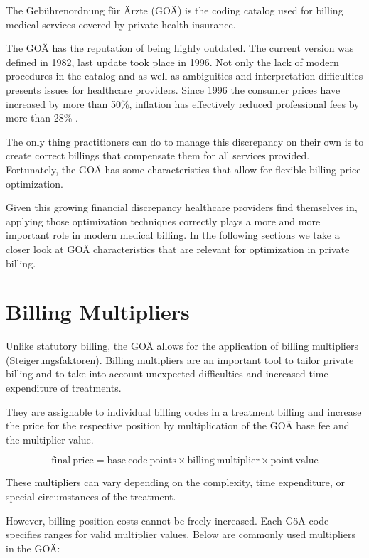 The Gebührenordnung für Ärzte (GOÄ) is the coding catalog used for billing medical services covered by private health insurance.

The GOÄ has the reputation of being highly outdated\cite{heller2015goa}.
The current version was defined in 1982, last update took place in 1996.
Not only the lack of modern procedures in the catalog and as well as ambiguities and interpretation difficulties presents issues for healthcare providers.
Since 1996 the consumer prices have increased by more than 50\%, inflation has effectively reduced professional fees by more than 28\% \cite{schmitzgoa}.

The only thing practitioners can do to manage this discrepancy on their own is to create correct billings that compensate them for all services provided.
Fortunately, the GOÄ has some characteristics that allow for flexible billing price optimization.

Given this growing financial discrepancy healthcare providers find themselves in, applying those optimization techniques correctly plays a more and more important role in modern medical billing.
In the following sections we take a closer look at GOÄ characteristics that are relevant for optimization in private billing.

\section{Billing Multipliers}\label{sec:billing-multipliers}
Unlike statutory billing, the GOÄ allows for the application of billing multipliers (Steigerungsfaktoren).
Billing multipliers are an important tool to tailor private billing and to take into account unexpected difficulties and increased time expenditure of treatments\cite{walter2008abrechnung}.

They are assignable to individual billing codes in a treatment billing and increase the price for the respective position by multiplication of the GOÄ base fee and the multiplier value.

\[
    \mathrm{final\ price} = \mathrm{base\ code\ points} \times \mathrm{billing\ multiplier} \times \mathrm{point\ value}
\]


These multipliers can vary depending on the complexity, time expenditure, or special circumstances of the treatment.

However, billing position costs cannot be freely increased.
Each GöA code specifies ranges for valid multiplier values.
Below are commonly used multipliers in the GOÄ\cite[]{bruck1998kommentar}:

